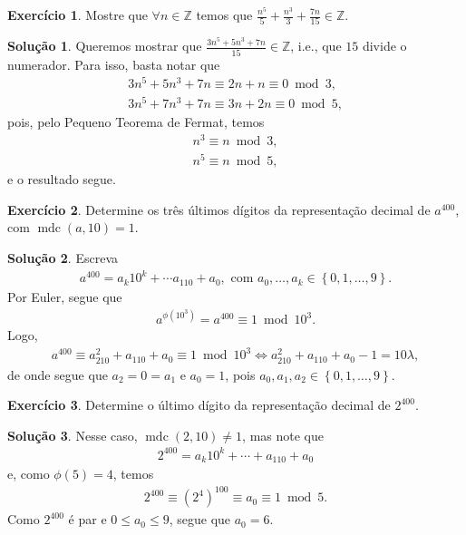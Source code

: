 \documentclass[a4paper,11pt,twoside, leqno]{article}
\DeclareMathOperator{\mdc}{mdc}
\theoremstyle{definition}
\newtheorem{exercise}{Exercício}
\newtheorem*{solution}{Solução}
\begin{document}
\begin{exercise}
	Mostre que $\forall n\in\mathbb{Z}$ temos que $\displaystyle{ \frac{n^5}{5} + \frac{n^3}{3} + \frac{7n}{15}\in\mathbb{Z}}$.
\end{exercise}
\begin{solution}
	Queremos mostrar que $\displaystyle{\frac{3n^5 + 5n^3 + 7n}{15}\in\mathbb{Z}}$, i.e., que $15$ divide o numerador. Para isso, basta notar que
	\begin{align*}
	3n^5 + 5n^3 + 7n\equiv 2n + n \equiv 0\bmod 3, \\
	3n^5 + 7n^3 + 7n \equiv 3n + 2n\equiv 0\bmod 5,
	\end{align*}
	pois, pelo Pequeno Teorema de Fermat, temos
	\begin{align*}
	n^3 \equiv n\bmod 3,\\
	n^5\equiv n\bmod 5,
	\end{align*}
	e o resultado segue.
\end{solution}

\begin{exercise}
	Determine os três últimos dígitos da representação decimal de $a^{400}$, com $\mdc(a,10) = 1$.
\end{exercise}
\begin{solution}
	Escreva
	\begin{align*}
	a^{400} = a_k10^k + \cdots a_110 + a_0, \text{ com } a_0,\dots,a_k\in\left\{0,1,\dots, 9\right\}.
	\end{align*}
	Por Euler, segue que
	\begin{align*}
	a^{\phi(10^3)} = a^{400}\equiv 1\bmod 10^3.
	\end{align*}
	Logo, 
	\begin{align*}
	a^{400}\equiv a_210^2 + a_110 + a_0 \equiv 1\bmod 10^3\Longleftrightarrow a_210^2 + a_110 + a_0-1 = 10\lambda,
	\end{align*}
	de onde segue que $a_2 = 0 = a_1$ e $a_0 = 1$, pois $a_0,a_1,a_2\in\left\{0,1,\dots,9\right\}$.
\end{solution}

\begin{exercise}
	Determine o último dígito da representação decimal de $2^{400}$.
\end{exercise}
\begin{solution}
	Nesse caso, $\mdc(2,10)\neq 1$, mas note que
	\begin{align*}
	2^{400} = a_k10^k + \cdots + a_110 + a_0
	\end{align*}
	e, como $\phi(5) = 4$, temos
	\begin{align*}
	2^{400} \equiv (2^4)^{100} \equiv a_0 \equiv 1\bmod 5.
	\end{align*}
	Como $2^{400}$ é par e $0\leq a_0\leq 9$, segue que $a_0 = 6$.
\end{solution}
\end{document}
